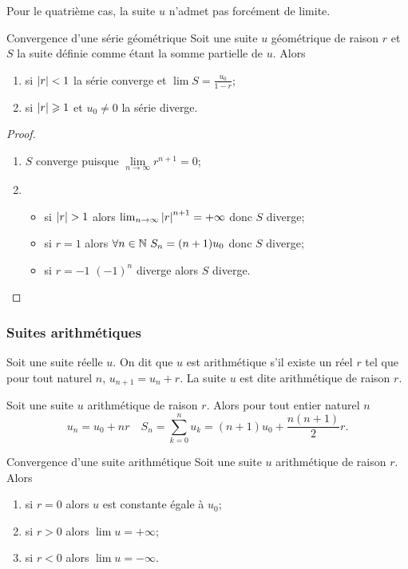Pour le quatrième cas, la suite $u$ n'admet pas forcément de limite.
\begin{prop}{Convergence d'une série géométrique}
  Soit une suite $u$ géométrique de raison $r$ et $S$ la suite définie comme étant la somme partielle de $u$. Alors
  \begin{enumerate}
  \item si $\left\lvert r\right\rvert < 1$ la série converge et $\lim S = \frac{u_0}{1-r}$;
  \item si $\left\lvert r\right\rvert \geqslant 1$ et $u_0 \neq 0$ la série diverge.
  \end{enumerate}
\end{prop}
\begin{proof}
  \begin{enumerate}
  \item $S$ converge puisque $\lim\limits_{n \to \infty} r^{n+1}=0$;
  \item 
    \begin{itemize} 
    \item si $\left\lvert r\right\rvert>1$ alors $\lim_{n \to \infty} \left\lvert r\right\rvert^{n+1}=+\infty$ donc $S$ diverge;
    \item si $r=1$ alors $\forall n \in \mathbb{N} \ S_n=(n+1)u_0$ donc $S$ diverge;
    \item si $r=-1$ $(-1)^n$ diverge alors $S$ diverge.
    \end{itemize}
  \end{enumerate}
\end{proof}

\subsubsection{Suites arithmétiques}

\begin{defdef}
  Soit une suite réelle $u$. On dit que $u$ est arithmétique s'il existe un réel $r$ tel que pour tout naturel $n$, $u_{n+1}=u_n +r$. La suite $u$ est dite arithmétique de raison $r$.
\end{defdef}
\begin{prop}
  Soit une suite $u$ arithmétique de raison $r$. Alors pour tout entier naturel $n$
  \begin{equation}
    u_n=u_0+nr \quad S_n=\sum_{k=0}^n u_k = (n+1)u_0 + \frac{n(n+1)}{2}r.
  \end{equation}
\end{prop}
\begin{prop}{Convergence d'une suite arithmétique}
  Soit une suite $u$ arithmétique de raison $r$. Alors
  \begin{enumerate}
  \item si $r=0$ alors $u$ est constante égale à $u_0$;
  \item si $r>0$ alors $\lim u =+\infty$;
  \item si $r<0$ alors $\lim u =-\infty$.
  \end{enumerate}
\end{prop}

